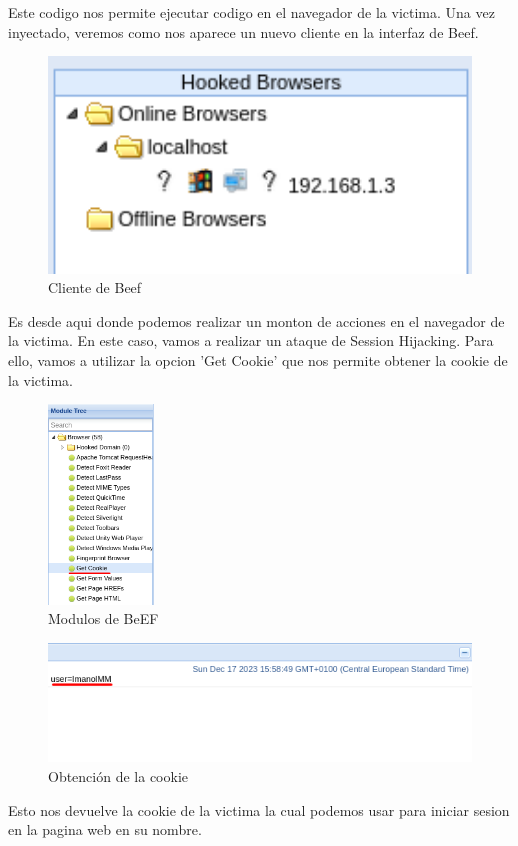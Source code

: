 \documentclass{report}
\begin{document}
                Este codigo nos permite ejecutar codigo en el navegador de la victima.
                Una vez inyectado, veremos como nos aparece un nuevo cliente en la interfaz de Beef.
                \begin{figure}[H]
                    \centering
                    \includegraphics[width=1\textwidth]{./img/vulnerabilidades/2.2/3.3.png}
                    \caption{Cliente de Beef}
                \end{figure}
                Es desde aqui donde podemos realizar un monton de acciones en el navegador de la victima.
                En este caso, vamos a realizar un ataque de Session Hijacking.
                Para ello, vamos a utilizar la opcion 'Get Cookie' que nos permite obtener la cookie de la victima.
                \begin{figure}[H]
                    \centering
                    \includegraphics[width=0.25\textwidth]{./img/vulnerabilidades/2.2/3.4.png}
                    \caption{Modulos de BeEF}
                \end{figure}
                \begin{figure}[H]
                    \centering
                    \includegraphics[width=1\textwidth]{./img/vulnerabilidades/2.2/3.5.png}
                    \caption{Obtención de la cookie}
                \end{figure}
                Esto nos devuelve la cookie de la victima la cual podemos usar para iniciar sesion en la pagina web en su nombre.\\
\end{document}
